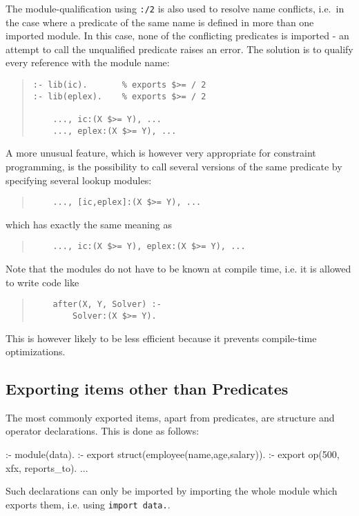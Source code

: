 The module-qualification using \verb.:/2. is also used to resolve
name conflicts,
i.e.\ in the case where a predicate of the same name is defined
in more than one imported module.
In this case, none of the conflicting
predicates is imported - an attempt to call the unqualified predicate
raises an error.
The solution is to qualify every reference with the module name:
\begin{quote}\begin{verbatim}
:- lib(ic).       % exports $>= / 2
:- lib(eplex).    % exports $>= / 2

    ..., ic:(X $>= Y), ...
    ..., eplex:(X $>= Y), ...
\end{verbatim}\end{quote}
A more unusual feature, which is however very appropriate for
constraint programming, is the possibility to call several versions
of the same predicate by specifying several lookup modules:
\begin{quote}\begin{verbatim}
    ..., [ic,eplex]:(X $>= Y), ...
\end{verbatim}\end{quote}
which has exactly the same meaning as
\begin{quote}\begin{verbatim}
    ..., ic:(X $>= Y), eplex:(X $>= Y), ...
\end{verbatim}\end{quote}
Note that the modules do not have to be known at compile time, i.e. it
is allowed to write code like
\begin{quote}\begin{verbatim}
    after(X, Y, Solver) :-
        Solver:(X $>= Y).
\end{verbatim}\end{quote}
This is however likely to be less efficient because it prevents
compile-time optimizations.




\subsection{Exporting items other than Predicates}
The most commonly exported items, apart from predicates,
are structure and operator declarations.
This is done as follows:
\begin{code}
:- module(data).
:- export struct(employee(name,age,salary)).
:- export op(500, xfx, reports_to).
...
\end{code}
Such declarations can only be imported by importing the whole
module which exports them, i.e. using {\tt import data.}.


